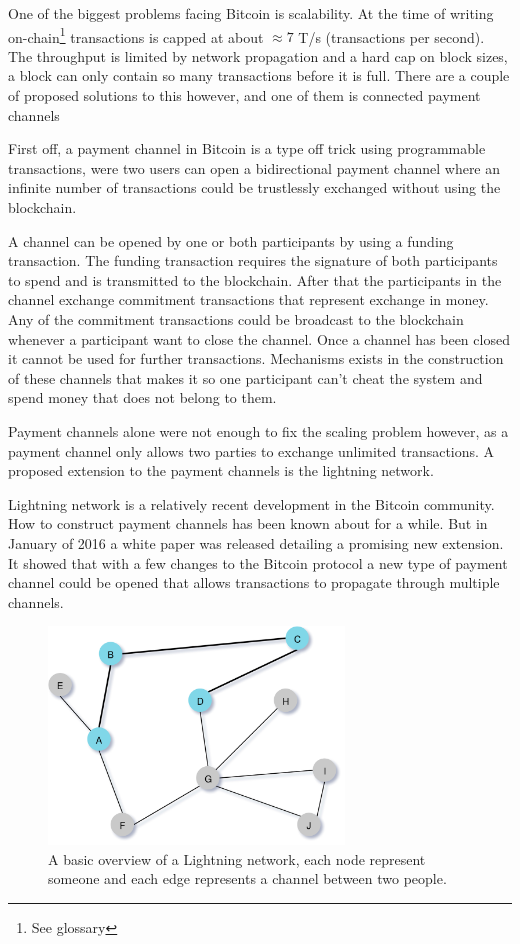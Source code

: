 
One of the biggest problems facing Bitcoin is scalability. At the time of writing
on-chain\footnote{See glossary} transactions is capped at about $\approx 7$ T/s (transactions per second).\cite{scaling}
The throughput is limited by network propagation and a hard cap on block sizes, a block
can only contain so many transactions before it is full. There are a couple of
proposed solutions to this however, and one of them is connected payment channels

First off, a payment channel in Bitcoin is a type off trick using programmable transactions,
were two users can open a bidirectional payment channel where an infinite number of transactions
could be trustlessly exchanged without using the blockchain.

A channel can be opened by one or both participants by using a funding transaction. The funding
transaction requires the signature of both participants to spend and is transmitted to the blockchain.
After that the participants in the channel exchange commitment transactions that represent exchange in money.
Any of the commitment transactions could be broadcast to the blockchain whenever a participant
want to close the channel. Once a channel has been closed it cannot be used for further transactions.
Mechanisms exists in the construction of these channels that makes it so one participant
can't cheat the system and spend money that does not belong to them.

Payment channels alone were not enough to fix the scaling problem however, as a payment channel
only allows two parties to exchange unlimited transactions. A proposed extension to the
payment channels is the lightning network.

Lightning network is a relatively recent development in the Bitcoin community.
How to construct payment channels has been known about for a while. But in
January of 2016 a white paper was released detailing a promising new extension.\cite{lightningnetwork_2019}
It showed that with a few changes to the Bitcoin protocol a new type of
payment channel could be opened that allows transactions to propagate through multiple channels.\cite{lightningnetwork_2019}

\begin{figure}[H]
	\centering
	\includegraphics[width=0.70\textwidth]{introduction/images/mesh_network.png}
	\caption{A basic overview of a Lightning network, each node represent someone
	and each edge represents a channel between two people.}
	\label{fig:mesh}
\end{figure}

